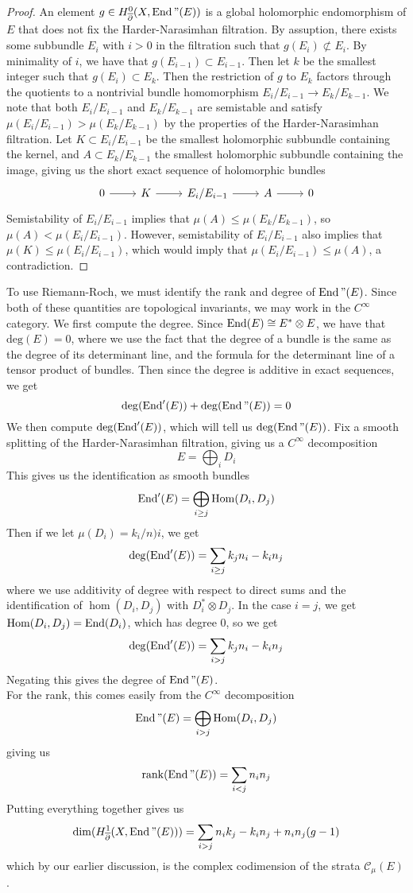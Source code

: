\begin{proof}
An element $g \in H^0_{\overline{\partial}}(X,\operatorname{End}"(E))$ is a global holomorphic endomorphism of
$E$ that does not fix the Harder-Narasimhan filtration. By assuption,
there exists some subbundle $E_i$ with $i > 0$ in the filtration such that
$g(E_i) \not\subset E_i$. By minimality of $i$, we have that
$g(E_{i-1}) \subset E_{i-1}$. Then let $k$ be the smallest integer such
that $g(E_i) \subset E_k$. Then the restriction of $g$ to $E_k$ factors
through the quotients to a nontrivial bundle homomorphism
$E_i/E_{i-1} \to E_k/E_{k-1}$. We note that both $E_i/E_{i-1}$ and $E_k/E_{k-1}$
are semistable and satisfy $\mu(E_i/E_{i-1}) > \mu(E_k/E_{k-1})$ by the properties
of the Harder-Narasimhan filtration. Let $K \subset E_i/E_{i-1}$ be
the smallest holomorphic subbundle containing the kernel, and
$A \subset E_k/E_{k-1}$ the smallest holomorphic subbundle containing the image,
giving us the short exact sequence of holomorphic bundles
\[\begin{tikzcd}
0 \ar[r] & K \ar[r] & E_i/E_{i-1} \ar[r] & A \ar[r] & 0
\end{tikzcd}\]
Semistability of $E_i/E_{i-1}$ implies that $\mu(A) \leq \mu(E_k/E_{k-1})$,
so $\mu(A) < \mu(E_i/E_{i-1})$. However, semistability of $E_i/E_{i-1}$ also
implies that $\mu(K) \leq \mu(E_i/E_{i-1})$, which would imply that
$\mu(E_i/E_{i-1}) \leq \mu(A)$, a contradiction.
\end{proof}
%
To use Riemann-Roch, we must identify the rank and degree of $\operatorname{End}"(E)$.
Since both of these quantities are topological invariants, we may work
in the $C^\infty$ category. We first compute the degree.
Since $\operatorname{End}(E) \cong E^*\otimes E$, we have that
$\mathrm{deg}(E) = 0$, where we use the fact that the degree of a bundle
is the same as the degree of its determinant line, and the formula for
the determinant line of a tensor product of bundles. Then since the
degree is additive in exact sequences, we get
\[
\mathrm{deg}(\operatorname{End}'(E)) + \mathrm{deg}(\operatorname{End}"(E)) = 0
\]
We then compute $\mathrm{deg}(\operatorname{End}'(E))$, which will tell us $\mathrm{deg}(\operatorname{End}"(E))$.
Fix a smooth splitting of the Harder-Narasimhan filtration, giving us a
$C^\infty$ decomposition
\[
E = \bigoplus_i D_i
\]
This gives us the identification as smooth bundles
\[
\operatorname{End}'(E) = \bigoplus_{i \geq j}\mathrm{Hom}(D_i,D_j)
\]
Then if we let $\mu(D_i) = k_i/n)i$, we get
\[
\mathrm{deg}(\operatorname{End}'(E)) = \sum_{i\geq j} k_jn_i - k_in_j
\]
where we use additivity of degree with respect to direct sums and
the identification of $\hom(D_i,D_j)$ with $D_i^*\otimes D_j$. In the
case $i = j$, we get $\mathrm{Hom}(D_i,D_j) = \operatorname{End}(D_i)$, which has degree $0$,
so we get
\[
\mathrm{deg}(\operatorname{End}'(E)) = \sum_{i > j} k_jn_i - k_in_j
\]
Negating this gives the degree of $\operatorname{End}"(E)$. \\

For the rank, this comes easily from the $C^\infty$ decomposition
\[
\operatorname{End}"(E) = \bigoplus_{i > j}\mathrm{Hom}(D_i,D_j)
\]
giving us
\[
\mathrm{rank}(\operatorname{End}"(E)) = \sum_{i < j} n_in_j
\]
Putting everything together gives us
\[
\dim(H^1_{\overline{\partial}}(X,\operatorname{End}"(E))) = \sum_{i > j}n_ik_j-k_in_j + n_in_j(g-1)
\]
which by our earlier discussion, is the complex codimension of the strata
$\mathscr{C}_\mu(E)$.
%